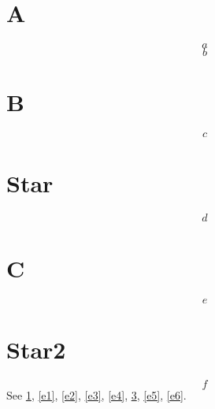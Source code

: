 \documentclass{jfm}
\begin{document}
\section{A}\label{sA}
\begin{equation}a\label{e1}\end{equation}
\begin{equation}b\label{e2}\end{equation}
\section{B}\label{sB}
\begin{equation}c\label{e3}\end{equation}
\section*{Star}
\begin{equation}d\label{e4}\end{equation}
\appendix
\section{C}\label{sC}
\begin{equation}e\label{e5}\end{equation}
\section*{Star2}
\begin{equation}f\label{e6}\end{equation}
See \ref{sA}, \ref{e1}, \ref{e2}, \ref{e3}, \ref{e4}, \ref{sC}, \ref{e5}, \ref{e6}.
\end{document}
